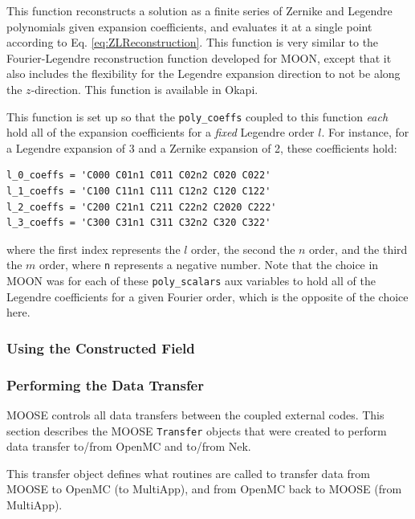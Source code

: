 \documentclass[10pt]{article}
\newcounter{subsubsubsection}[subsubsection]
\numberwithin{equation}{section} %
\begin{document}
This function reconstructs a solution as a finite series of Zernike and Legendre polynomials given expansion coefficients, and evaluates it at a single point according to Eq. \eqref{eq:ZLReconstruction}. This function is very similar to the Fourier-Legendre reconstruction function developed for MOON, except that it also includes the flexibility for the Legendre expansion direction to not be along the \(z\)-direction. This function is available in Okapi.

This function is set up so that the {\tt poly\_coeffs} coupled to this function {\it each} hold all of the expansion coefficients for a {\it fixed} Legendre order \(l\). For instance, for a Legendre expansion of 3 and a Zernike expansion of 2, these coefficients hold:

\begin{lstlisting}
l_0_coeffs = 'C000 C01n1 C011 C02n2 C020 C022'
l_1_coeffs = 'C100 C11n1 C111 C12n2 C120 C122'
l_2_coeffs = 'C200 C21n1 C211 C22n2 C2020 C222'
l_3_coeffs = 'C300 C31n1 C311 C32n2 C320 C322'
\end{lstlisting}

where the first index represents the \(l\) order, the second the \(n\) order, and the third the \(m\) order, where {\tt n} represents a negative number. Note that the choice in MOON was for each of these {\tt poly\_scalars} aux variables to hold all of the Legendre coefficients for a given Fourier order, which is the opposite of the choice here. 

\subsubsection{Using the Constructed Field}

\subsubsection{Performing the Data Transfer}
MOOSE controls all data transfers between the coupled external codes. This section describes the MOOSE {\tt Transfer} objects that were created to perform data transfer to/from OpenMC and to/from Nek.

This transfer object defines what routines are called to transfer data from MOOSE to OpenMC (to MultiApp), and from OpenMC back to MOOSE (from MultiApp). 
\end{document}
